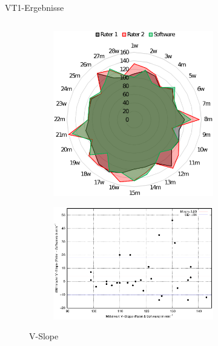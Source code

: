 \documentclass[colorBG,slideColor,8pt]{beamer}
\begin{document}
\begin{frame}[fragile]{VT1-Ergebnisse}
\begin{columns}
	\begin{column}{0.5\linewidth}
		\begin{figure}
			\begin{subfigure}{0.9\linewidth}
				\centering
				\includegraphics[width=0.6\linewidth]{Bilder/v-slope_net.eps}
			\end{subfigure}
			\begin{subfigure}{0.9\linewidth}
				\centering
				\includegraphics[width=0.82\linewidth]{Bilder/vslope.eps}
			\end{subfigure}	
			\caption{V-Slope}	
		\end{figure}
	\end{column}
	\begin{column}{0.5\linewidth}
		\begin{figure}
			\begin{subfigure}{0.9\linewidth}
				\centering

\end{subfigure}
\end{figure}
\end{column}
\end{columns}
\end{frame}
\end{document}
